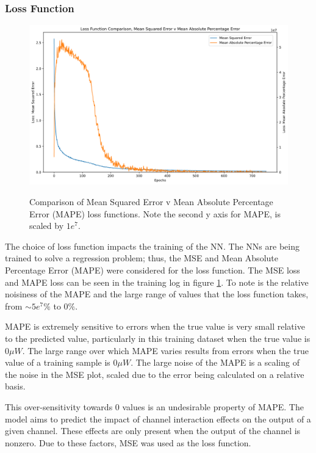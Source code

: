 \subsubsection{Loss Function} \label{subsec:loss_func} \FloatBarrier


\begin{figure}[h]
    \centering
    \caption{Comparison of Mean Squared Error v Mean Absolute Percentage Error (MAPE) loss functions. Note the second y axis for MAPE, is scaled by $1e^7$.}
    \includegraphics[width=\textwidth]{project/img/ml_model/discrete/mse_mpe.png}
    \label{fig:ml_model:mse_mpe}
\end{figure}

The choice of loss function impacts the training of the NN. The NNs are being trained to solve a regression problem; thus, the MSE and Mean Absolute Percentage Error (MAPE) were considered for the loss function. The MSE loss and MAPE loss can be seen in the training log in figure \ref{fig:ml_model:mse_mpe}. To note is the relative noisiness of the MAPE and the large range of values that the loss function takes, from $\sim 5e^7\%$ to $0\%$.

MAPE is extremely sensitive to errors when the true value is very small relative to the predicted value, particularly in this training dataset when the true value is $0\mu W$. The large range over which MAPE varies results from errors when the true value of a training sample is $0 \mu W$. The large noise of the MAPE is a scaling of the noise in the MSE plot, scaled due to the error being calculated on a relative basis.

This over-sensitivity towards 0 values is an undesirable property of MAPE. The model aims to predict the impact of channel interaction effects on the output of a given channel. These effects are only present when the output of the channel is nonzero. Due to these factors, MSE was used as the loss function. 



